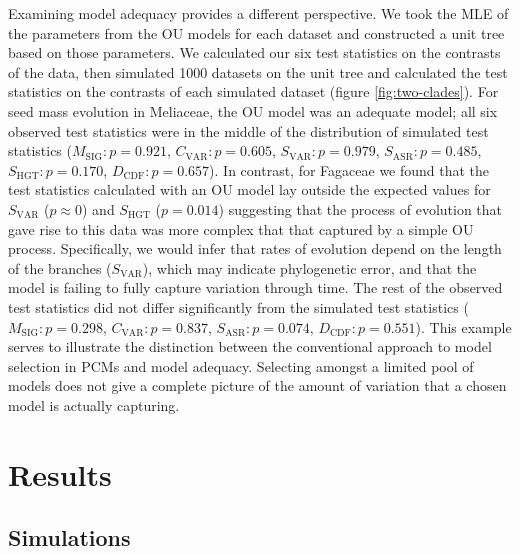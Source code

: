 \documentclass[a4paper,11pt]{article}
\begin{document}
Examining model adequacy provides a different perspective. We took the MLE of the parameters from the OU models for each dataset and constructed a unit tree based on those parameters. We calculated our six test statistics on the contrasts of the data, then simulated 1000 datasets on the unit tree and calculated the test statistics on the contrasts of each simulated dataset (figure \ref{fig:two-clades}). For seed mass evolution in Meliaceae, the OU model was an adequate model; all six observed test statistics were in the middle of the distribution of simulated test statistics ($M_{\text{SIG}}: p=0.921$, $C_{\text{VAR}}: p=0.605$, $S_{\text{VAR}}: p=0.979$, $S_{\text{ASR}}:p=0.485$, $S_{\text{HGT}}: p=0.170$, $D_{\text{CDF}}: p=0.657$). In contrast, for Fagaceae we found that the test statistics calculated with an OU model lay outside the expected values for $S_{\text{VAR}}$ ($p \approx 0$) and $S_{\text{HGT}}$ ($p = 0.014$) suggesting that the process of evolution that gave rise to this data was more complex that that captured by a simple OU process. Specifically, we would infer that rates of evolution depend on the length of the branches ($S_{\text{VAR}}$), which may indicate phylogenetic error, and that the model is failing to fully capture variation through time. The rest of the observed test statistics did not differ significantly from the simulated test statistics ($M_{\text{SIG}}: p=0.298$, $C_{\text{VAR}}:p=0.837$, $S_{\text{ASR}}:p=0.074$, $D_{\text{CDF}}: p=0.551$). This example serves to illustrate the distinction between the conventional approach to model selection in PCMs and model adequacy. Selecting amongst a limited pool of models does not give a complete picture of the amount of variation that a chosen model is actually capturing.


\section{Results}

\subsection{Simulations}
\end{document}
